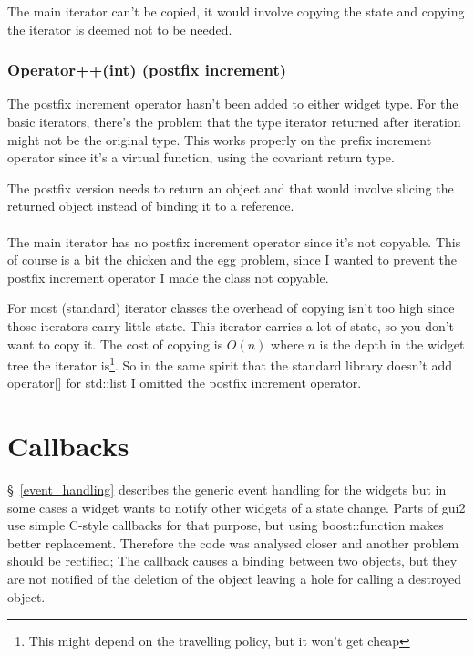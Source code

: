 The main iterator can't be copied, it would involve copying the state
and copying the iterator is deemed not to be needed.

\subsubsection{Operator++(int) (postfix increment)}

The postfix increment operator hasn't been added to either widget type. For the
basic iterators, there's the problem that the type iterator returned after
iteration might not be the original type. This works properly on the prefix
increment operator since it's a virtual function, using the covariant return
type.

The postfix version needs to return an object and that would involve slicing the
returned object instead of binding it to a reference.

\paragraph{}

The main iterator has no postfix increment operator since it's not copyable.
This of course is a bit the chicken and the egg problem, since I wanted to
prevent the postfix increment operator I made the class not copyable.

For most (standard) iterator classes the overhead of copying isn't too high
since those iterators carry little state.  This iterator carries a lot of state,
so you don't want to copy it. The cost of copying is $O(n)$ where $n$ is the
depth in the widget tree the iterator is\footnote{This might depend on the
travelling policy, but it won't get cheap}. So in the same spirit that the
standard library doesn't add operator[] for std::list I omitted the postfix
increment operator.


\section{Callbacks}

\S~\ref{event_handling} describes the generic event handling for the widgets but
in some cases a widget wants to notify other widgets of a state change. Parts of
gui2 use simple C-style callbacks for that purpose, but using boost::function
makes better replacement. Therefore the code was analysed closer and another
problem should be rectified; The callback causes a binding between two objects,
but they are not notified of the deletion of the object leaving a hole for
calling a destroyed object.

